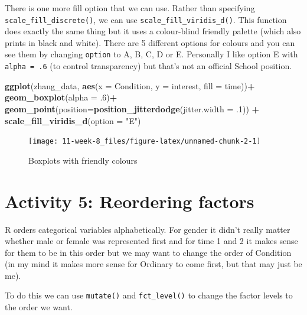 \documentclass[]{book}
\newenvironment{Shaded}{\begin{snugshade}}{\end{snugshade}}
\newcommand{\DataTypeTok}[1]{\textcolor[rgb]{0.13,0.29,0.53}{#1}}
\newcommand{\FloatTok}[1]{\textcolor[rgb]{0.00,0.00,0.81}{#1}}
\newcommand{\KeywordTok}[1]{\textcolor[rgb]{0.13,0.29,0.53}{\textbf{#1}}}
\newcommand{\NormalTok}[1]{#1}
\newcommand{\OperatorTok}[1]{\textcolor[rgb]{0.81,0.36,0.00}{\textbf{#1}}}
\newcommand{\StringTok}[1]{\textcolor[rgb]{0.31,0.60,0.02}{#1}}
\begin{document}
There is one more fill option that we can use. Rather than specifying \texttt{scale\_fill\_discrete()}, we can use \texttt{scale\_fill\_viridis\_d()}. This function does exactly the same thing but it uses a colour-blind friendly palette (which also prints in black and white). There are 5 different options for colours and you can see them by changing \texttt{option} to A, B, C, D or E. Personally I like option E with \texttt{alpha\ =\ .6} (to control transparency) but that's not an official School position.

\begin{Shaded}
\begin{Highlighting}[]
\KeywordTok{ggplot}\NormalTok{(zhang_data, }\KeywordTok{aes}\NormalTok{(}\DataTypeTok{x =}\NormalTok{ Condition, }\DataTypeTok{y =}\NormalTok{ interest, }\DataTypeTok{fill =}\NormalTok{ time))}\OperatorTok{+}
\StringTok{  }\KeywordTok{geom_boxplot}\NormalTok{(}\DataTypeTok{alpha =} \FloatTok{.6}\NormalTok{)}\OperatorTok{+}
\StringTok{  }\KeywordTok{geom_point}\NormalTok{(}\DataTypeTok{position=}\KeywordTok{position_jitterdodge}\NormalTok{(}\DataTypeTok{jitter.width =} \FloatTok{.1}\NormalTok{)) }\OperatorTok{+}
\StringTok{  }\KeywordTok{scale_fill_viridis_d}\NormalTok{(}\DataTypeTok{option =} \StringTok{"E"}\NormalTok{)}
\end{Highlighting}
\end{Shaded}

\begin{figure}

{\centering \texttt{[image: 11-week-8\_files/figure-latex/unnamed-chunk-2-1]} 

}

\caption{Boxplots with friendly colours}\label{fig:unnamed-chunk-2}
\end{figure}

\hypertarget{activity-5-reordering-factors}{%
\section{Activity 5: Reordering factors}\label{activity-5-reordering-factors}}

R orders categorical variables alphabetically. For gender it didn't really matter whether male or female was represented first and for time 1 and 2 it makes sense for them to be in this order but we may want to change the order of Condition (in my mind it makes more sense for Ordinary to come first, but that may just be me).

To do this we can use \texttt{mutate()} and \texttt{fct\_level()} to change the factor levels to the order we want.
\end{document}
